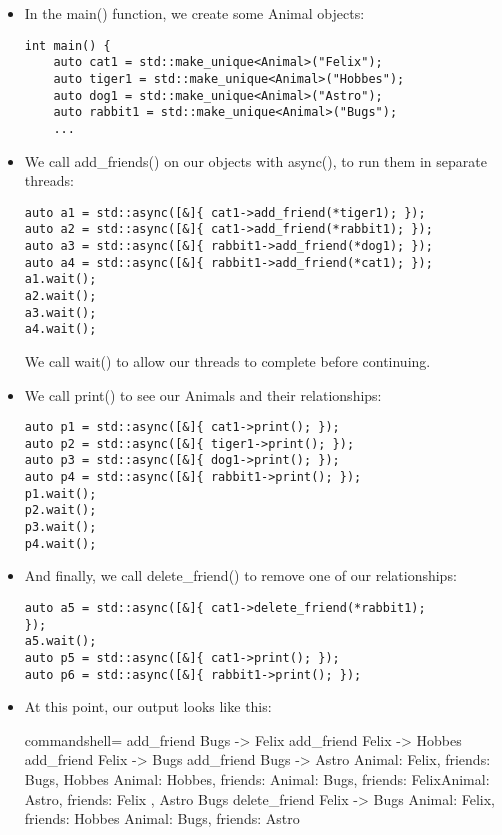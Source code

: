 \begin{itemize}
\item 
In the main() function, we create some Animal objects:

\begin{lstlisting}[style=styleCXX]
int main() {
	auto cat1 = std::make_unique<Animal>("Felix");
	auto tiger1 = std::make_unique<Animal>("Hobbes");
	auto dog1 = std::make_unique<Animal>("Astro");
	auto rabbit1 = std::make_unique<Animal>("Bugs");
	...
\end{lstlisting}

\item 
We call add\_friends() on our objects with async(), to run them in separate threads:

\begin{lstlisting}[style=styleCXX]
auto a1 = std::async([&]{ cat1->add_friend(*tiger1); });
auto a2 = std::async([&]{ cat1->add_friend(*rabbit1); });
auto a3 = std::async([&]{ rabbit1->add_friend(*dog1); });
auto a4 = std::async([&]{ rabbit1->add_friend(*cat1); });
a1.wait();
a2.wait();
a3.wait();
a4.wait();
\end{lstlisting}

We call wait() to allow our threads to complete before continuing.

\item 
We call print() to see our Animals and their relationships:

\begin{lstlisting}[style=styleCXX]
auto p1 = std::async([&]{ cat1->print(); });
auto p2 = std::async([&]{ tiger1->print(); });
auto p3 = std::async([&]{ dog1->print(); });
auto p4 = std::async([&]{ rabbit1->print(); });
p1.wait();
p2.wait();
p3.wait();
p4.wait();
\end{lstlisting}

\item 
And finally, we call delete\_friend() to remove one of our relationships:

\begin{lstlisting}[style=styleCXX]
auto a5 = std::async([&]{ cat1->delete_friend(*rabbit1);
});
a5.wait();
auto p5 = std::async([&]{ cat1->print(); });
auto p6 = std::async([&]{ rabbit1->print(); });
\end{lstlisting}

\item 
At this point, our output looks like this:

\begin{tcblisting}{commandshell={}}
add_friend Bugs -> Felix
add_friend Felix -> Hobbes
add_friend Felix -> Bugs
add_friend Bugs -> Astro
Animal: Felix, friends: Bugs, Hobbes
Animal: Hobbes, friends: Animal: Bugs, friends:
FelixAnimal: Astro, friends: Felix
, Astro
Bugs
delete_friend Felix -> Bugs
Animal: Felix, friends: Hobbes
Animal: Bugs, friends: Astro
\end{tcblisting}


\end{itemize}
